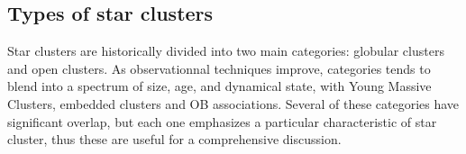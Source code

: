 %
%

\subsection{Types of star clusters}

Star clusters are historically divided into two main categories: globular clusters and open clusters. As observationnal techniques improve, categories tends to blend into a spectrum of size, age, and dynamical state, with Young Massive Clusters, embedded clusters and OB associations. Several of these categories have significant overlap, but each one emphasizes a particular characteristic of star cluster, thus these are useful for a comprehensive discussion.



